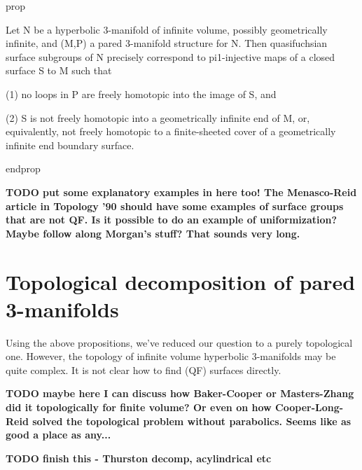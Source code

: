 prop

Let N be a hyperbolic 3-manifold of infinite volume, possibly geometrically
infinite, and (M,P) a pared 3-manifold structure for N. Then quasifuchsian
surface subgroups of N precisely correspond to pi1-injective maps of a closed
surface S to M such that

(1) no loops in P are freely homotopic into the image of S, and

(2) S is not freely homotopic into a geometrically infinite end of M, or,
equivalently, not freely homotopic to a finite-sheeted cover of a geometrically
infinite end boundary surface.

endprop

\textbf{ TODO put some explanatory examples in here too! The Menasco-Reid
article in Topology '90 should have some examples of surface groups that are
not QF. Is it possible to do an example of uniformization? Maybe follow along
Morgan's stuff? That sounds very long. }

\section{Topological decomposition of pared 3-manifolds}

Using the above propositions, we've reduced our question to a purely
topological one. However, the topology of infinite volume hyperbolic
3-manifolds may be quite complex. It is not clear how to find (QF) surfaces
directly.

\textbf{ TODO maybe here I can discuss how Baker-Cooper or Masters-Zhang did it
topologically for finite volume? Or even on how Cooper-Long-Reid solved the
topological problem without parabolics. Seems like as good a place as any...}


\textbf{TODO finish this - Thurston decomp, acylindrical etc}

